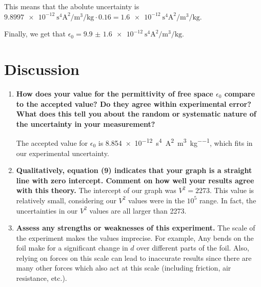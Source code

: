 \documentclass[11pt]{article}
\begin{document}
        This means that the abolute uncertainty is $\SI{9.8997e-12}{\second\tothe{4}\ampere\squared\per\meter\cubed\per\kilogram}\cdot0.16=\SI{1.6e-12}{\second\tothe{4}\ampere\squared\per\meter\cubed\per\kilogram}$.
        \par\noindent
        Finally, we get that $\epsilon_0=\SI{9.9(16)e-12}{\second\tothe{4}\ampere\squared\per\meter\cubed\per\kilogram}$.
    \pagebreak
    \section*{Discussion}
        \begin{enumerate}[label={\textbf{\arabic*.}}]
            \item{
                \textbf{How does your value for the permittivity of free space $\epsilon_0$ compare to the accepted value? Do they agree within experimental error? What does this tell you about the random or systematic nature of the uncertainty in your measurement?}
                \par
                The accepted value for $\epsilon_0$ is \SI{8.854e-12}{\second\tothe{4}\ampere\squared\per\meter\cubed\per\kilogram}, which fits in our experimental uncertainty.
            }
            \item{
                \textbf{Qualitatively, equation (9) indicates that your graph is a straight line with zero intercept. Comment on how well your results agree with this theory.}
                The intercept of our graph was $V^2=2273$. This value is relatively small, considering our $V^2$ values were in the $10^5$ range. In fact, the uncertainties in our $V^2$ values are all larger than 2273.
            }
            \item{
                \textbf{Assess any strengths or weaknesses of this experiment.}
                The scale of the experiment makes the values imprecise. For example, Any bends on the foil make for a significant change in $d$ over different parts of the foil. Also, relying on forces on this scale can lead to inaccurate results since there are many other forces which also act at this scale (including friction, air resistance, etc.).
            }
        \end{enumerate}
\end{document}
